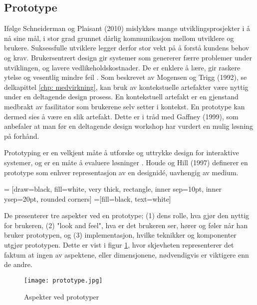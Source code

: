 \subsection{Prototype}
Ifølge Schneiderman og Plaisant (2010) mislykkes mange utviklingsprosjekter i å nå sine mål, i stor grad grunnet dårlig kommunikasjon mellom utviklere og brukere. Suksessfulle utviklere legger derfor stor vekt på å forstå kundens behov og krav. 
Brukersentrert design gir systemer som genererer færre problemer under utviklingen, og lavere vedlikeholdskostnader. De er enklere å lære, gir raskere ytelse og vesentlig mindre feil \cite{mmi}.
Som beskrevet av Mogensen og Trigg (1992), se delkapittel \ref{chp: medvirkning}, kan bruk av kontekstuelle artefakter være nyttig under en deltagende design prosess. En kontekstuell artefakt er en gjenstand medbrakt av fasilitator som brukerene selv setter i kontekst. En prototype kan dermed sies å være en slik artefakt. Dette er i tråd med Gaffney (1999), som anbefaler at man før en deltagende design workshop har vurdert en mulig løsning på forhånd.

\noindent
Prototyping er en velkjent måte å utforske og uttrykke design for interaktive systemer, og er en måte å evaluere løsninger \cite{Houde97}. Houde og Hill (1997) definerer en prototype som enhver representasjon av en designidé, uavhengig av medium. 

 = [draw=black, fill=white, very thick,
    rectangle, inner sep=10pt, inner ysep=20pt, rounded corners]
 =[fill=black, text=white]
%

\noindent
De presenterer tre aspekter ved en prototype; (1) dens rolle, hva gjør den nyttig for brukeren, (2) "look and feel", hva er det brukeren ser, hører og føler når han bruker prototypen, og (3) implementasjon, hvilke teknikker og komponenter utgjør prototypen. Dette er vist i figur \ref{fig: prototype}, hvor skjevheten representerer det faktum at ingen av aspektene, eller dimensjonene, nødvendigvis er viktigere enn de andre.

\begin{figure}[H]
\centering
\texttt{[image: prototype.jpg]}
\caption{Aspekter ved prototyper}
\label{fig: prototype}
\end{figure}

